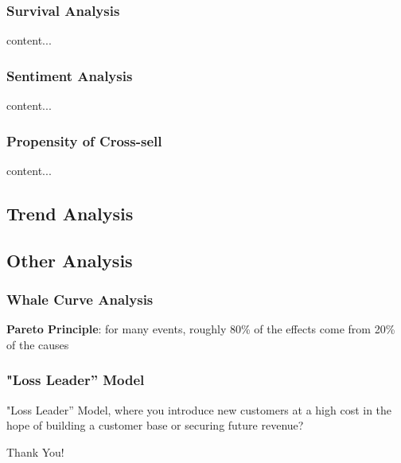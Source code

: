 \documentclass{beamer}
\begin{document}
\begin{frame}\frametitle{Survival Analysis}
content...
\end{frame}

\begin{frame}\frametitle{Sentiment Analysis}
content...
\end{frame}

\begin{frame}\frametitle{Propensity of Cross-sell}
content...
\end{frame}


\subsection{Trend Analysis}


\subsection{Other Analysis}
\begin{frame}\frametitle{Whale Curve Analysis}
	\textbf{Pareto Principle}: for many events, roughly 80\% of the effects come from 20\% of the causes\\
	
\end{frame}

\begin{frame}\frametitle{"Loss Leader” Model}

"Loss Leader” Model, where you introduce new customers at a high cost in the hope of building a customer base or securing future revenue? 

\end{frame}

\begin{frame}
	Thank You!
\end{frame}
\end{document}
